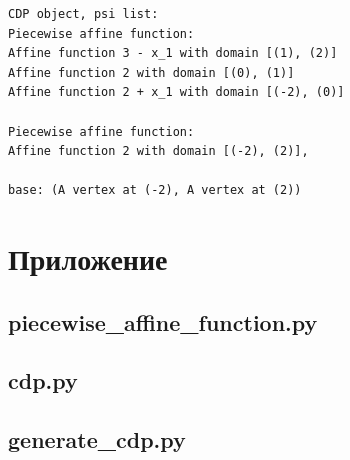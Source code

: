 \documentclass[fontsize=14pt]{scrartcl}
\theoremstyle{definition}
\begin{document}
\begin{lstlisting}[style=output]
CDP object, psi list:
Piecewise affine function:
Affine function 3 - x_1 with domain [(1), (2)]
Affine function 2 with domain [(0), (1)]
Affine function 2 + x_1 with domain [(-2), (0)]

Piecewise affine function:
Affine function 2 with domain [(-2), (2)],

base: (A vertex at (-2), A vertex at (2))
\end{lstlisting}



\section{Приложение}
\fontsize{14}{12}\selectfont
\subsection{piecewise\_affine\_function.py} \label{piece}

\clearpage
\subsection{cdp.py} \label{cdppy}

\clearpage
\subsection{generate\_cdp.py} \label{gen}

\clearpage
\restoregeometry

\clearpage
\nocite{cdp}

\printbibliography %
\end{document}
